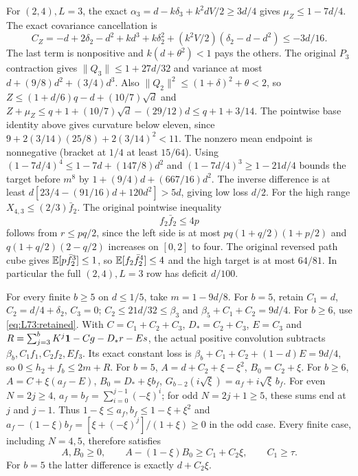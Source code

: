 For $(2,4),L=3$, the exact $\alpha_3=d-k\delta_3+k^2dV/2
\ge3d/4$ gives $\mu_Z\le1-7d/4$.
The exact covariance cancellation is
\[
C_Z=-d+2\delta_2-d^2+kd^3+k\delta_2^2
+(k^2V/2)(\delta_2-d-d^2)\le-3d/16.
\]
The last term is nonpositive and $k(d+\theta^2)<1$ pays the others.
The original $P_3$ contraction gives
$\|Q_3\|\le1+27d/32$ and variance at most
$d+(9/8)d^2+(3/4)d^3$.
Also $\|Q_2\|^2\le(1+\delta)^2+\theta<2$, so
$Z\le(1+d/6)q-d+(10/7)\sqrt d$ and
$Z+\mu_Z\le q+1+(10/7)\sqrt d-(29/12)d\le q+1+3/14$.
The pointwise base identity above gives curvature below eleven,
since $9+2(3/14)(25/8)+2(3/14)^2<11$.
The nonzero mean endpoint is nonnegative (bracket at $1/4$ at least
$15/64$). Using
$(1-7d/4)^4\le1-7d+(147/8)d^2$ and
$(1-7d/4)^3\ge1-21d/4$ bounds the target before $m^8$ by
$1+(9/4)d+(667/16)d^2$.
The inverse difference is at least
$d[23/4-(91/16)d+120d^2]>5d$, giving low loss $d/2$.
For the high range $X_{4,3}\le(2/3)\bar f_2$.
The original pointwise inequality
\begin{equation}\tag{L77.3.7}\label{eq:L77:crosspath}
f_2\bar f_2\le4p
\end{equation}
follows from $r\le pq/2$, since the left side is at most
$pq(1+q/2)(1+p/2)$ and
$q(1+q/2)(2-q/2)$ increases on $[0,2]$ to four.
The original reversed path cube gives $\mathbb E[p\bar f_2^3]\le1$,
so $\mathbb E[f_2\bar f_2^4]\le4$ and the high target is at most $64/81$.
In particular the full $(2,4),L=3$ row has deficit $d/100$.

For every finite $b\ge5$ on $d\le1/5$, take $m=1-9d/8$.
For $b=5$, retain $C_1=d$, $C_2=d/4+\delta_2$, $C_3=0$;
$C_2\le21d/32\le\beta_3$ and
$\beta_5+C_1+C_2=9d/4$.
For $b\ge6$, use \eqref{eq:L73:retained}.
With $C=C_1+C_2+C_3$, $D_*=C_2+C_3$, $E=C_3$ and
$R=\sum_{j=3}^bK^j\mathbf1-Cg-D_*r-Es$,
the actual positive convolution subtracts
$\beta_b,C_1f_1,C_2f_2,Ef_3$.
Its exact constant loss is
$\beta_b+C_1+C_2+(1-d)E=9d/4$, so
$0\le h_2+f_b\le2m+R$.
For $b=5$, $A=d+C_2+\xi-\xi^2$, $B_0=C_2+\xi$.
For $b\ge6$, $A=C+\xi(a_f-E)$, $B_0=D_*+\xi b_f$,
$G_{b-2}(i\sqrt\xi)=a_f+i\sqrt\xi\,b_f$.
For even $N=2j\ge4$, $a_f=b_f=\sum_{i=0}^{j-1}(-\xi)^i$;
for odd $N=2j+1\ge5$, these sums end at $j$ and $j-1$.
Thus $1-\xi\le a_f,b_f\le1-\xi+\xi^2$ and
$a_f-(1-\xi)b_f=[\xi+(-\xi)^j]/(1+\xi)\ge0$ in the odd case.
Every finite case, including $N=4,5$, therefore satisfies
\begin{equation}\tag{L77.4.1b}\label{eq:L77:positivecoordinates}
A,B_0\ge0,\qquad A-(1-\xi)B_0\ge C_1+C_2\xi,\qquad C_1\ge\tau.
\end{equation}
For $b=5$ the latter difference is exactly $d+C_2\xi$.

